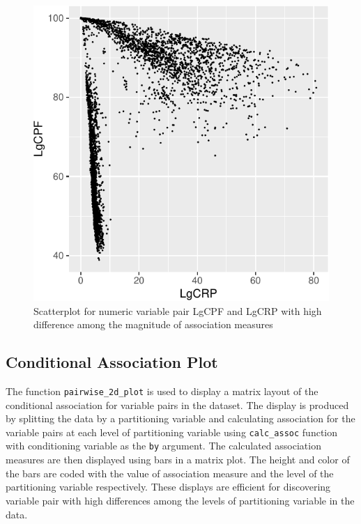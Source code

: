 \begin{Schunk}
\begin{figure}

{\centering \includegraphics{rj_paper_files/figure-latex/comp-var-pairs-1} 

}

\caption[Scatterplot for numeric variable pair LgCPF and LgCRP with high difference among the magnitude of association measures]{Scatterplot for numeric variable pair LgCPF and LgCRP with high difference among the magnitude of association measures}\label{fig:comp-var-pairs}
\end{figure}
\end{Schunk}

\hypertarget{conditional-association-plot}{%
\subsection{Conditional Association
Plot}\label{conditional-association-plot}}

The function \texttt{pairwise\_2d\_plot} is used to display a matrix
layout of the conditional association for variable pairs in the dataset.
The display is produced by splitting the data by a partitioning variable
and calculating association for the variable pairs at each level of
partitioning variable using \texttt{calc\_assoc} function with
conditioning variable as the \texttt{by} argument. The calculated
association measures are then displayed using bars in a matrix plot. The
height and color of the bars are coded with the value of association
measure and the level of the partitioning variable respectively. These
displays are efficient for discovering variable pair with high
differences among the levels of partitioning variable in the data.

